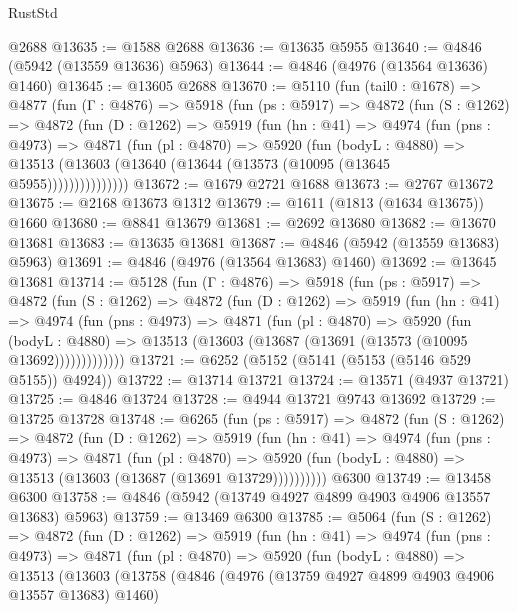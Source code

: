 \begin{lexlean}{RustStd}
\begin{coremodule}
    @2688
@13635 := @1588 @2688
@13636 := @13635 @5955
@13640 := @4846 (@5942 (@13559 @13636) @5963)
@13644 := @4846 (@4976 (@13564 @13636) @1460)
@13645 := @13605 @2688
@13670 := @5110
    (fun (tail0 : @1678) =>
    @4877
      (fun (Γ : @4876) =>
      @5918
        (fun (ps : @5917) =>
        @4872
          (fun (S : @1262) =>
          @4872
            (fun (D : @1262) =>
            @5919
              (fun (hn : @41) =>
              @4974
                (fun (pns : @4973) =>
                @4871
                  (fun (pl : @4870) =>
                  @5920
                    (fun (bodyL : @4880) =>
                    @13513 (@13603 (@13640 (@13644 (@13573 (@10095 (@13645 @5955)))))))))))))))
@13672 := @1679 @2721 @1688
@13673 := @2767 @13672
@13675 := @2168 @13673 @1312
@13679 := @1611 (@1813 (@1634 @13675)) @1660
@13680 := @8841 @13679
@13681 := @2692 @13680
@13682 := @13670 @13681
@13683 := @13635 @13681
@13687 := @4846 (@5942 (@13559 @13683) @5963)
@13691 := @4846 (@4976 (@13564 @13683) @1460)
@13692 := @13645 @13681
@13714 := @5128
    (fun (Γ : @4876) =>
    @5918
      (fun (ps : @5917) =>
      @4872
        (fun (S : @1262) =>
        @4872
          (fun (D : @1262) =>
          @5919
            (fun (hn : @41) =>
            @4974
              (fun (pns : @4973) =>
              @4871
                (fun (pl : @4870) =>
                @5920
                  (fun (bodyL : @4880) =>
                  @13513 (@13603 (@13687 (@13691 (@13573 (@10095 @13692)))))))))))))
@13721 := @6252 (@5152 (@5141 (@5153 (@5146 @529 @5155)) @4924))
@13722 := @13714 @13721
@13724 := @13571 (@4937 @13721)
@13725 := @4846 @13724
@13728 := @4944 @13721 @9743 @13692
@13729 := @13725 @13728
@13748 := @6265
    (fun (ps : @5917) =>
    @4872
      (fun (S : @1262) =>
      @4872
        (fun (D : @1262) =>
        @5919
          (fun (hn : @41) =>
          @4974
            (fun (pns : @4973) =>
            @4871
              (fun (pl : @4870) =>
              @5920 (fun (bodyL : @4880) => @13513 (@13603 (@13687 (@13691 @13729))))))))))
    @6300
@13749 := @13458 @6300
@13758 := @4846 (@5942 (@13749 @4927 @4899 @4903 @4906 @13557 @13683) @5963)
@13759 := @13469 @6300
@13785 := @5064
    (fun (S : @1262) =>
    @4872
      (fun (D : @1262) =>
      @5919
        (fun (hn : @41) =>
        @4974
          (fun (pns : @4973) =>
          @4871
            (fun (pl : @4870) =>
            @5920
              (fun (bodyL : @4880) =>
              @13513
                (@13603
                  (@13758
                    (@4846
                      (@4976 (@13759 @4927 @4899 @4903 @4906 @13557 @13683) @1460)

\end{coremodule}
\end{lexlean}
